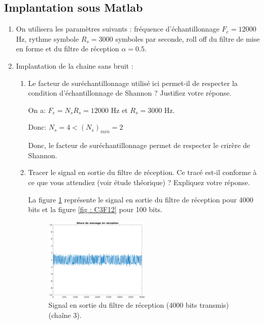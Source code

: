 \documentclass[frenchb]{article}
\begin{document}
\subsection{Implantation sous Matlab}

    \begin{enumerate}
        \item On utilisera les paramètres suivants : fréquence d'échantillonnage $F_e=12000$ Hz, rythme symbole $R_s=3000$ symboles par seconde, roll off du filtre de mise en forme et du filtre de réception $\alpha=0.5$.
        \item Implantation de la chaine sans bruit :
            \begin{enumerate}
                \item Le facteur de suréchantillonnage utilisé ici permet-il de respecter la condition d'échantillonnage de Shannon ? Justifiez votre réponse.
                
                \par\leavevmode\par
                \setlength\parindent{0.5cm}
                On a: $ F_e = N_s R_s = 12000$ Hz et $R_s = 3000$ Hz. 
                
                Donc: $N_s = 4 < (N_s)_{min}=2$
                
                Donc, le facteur de suréchantillonnage permet de respecter le crirère de Shannon.
                \par\leavevmode\par
                
                
                \item Tracer le signal en sortie du filtre de réception. Ce tracé est-il conforme à ce que vous attendiez (voir étude théorique) ? Expliquez votre réponse.
                \par\leavevmode\par
                \setlength\parindent{0.5cm}
                La figure \ref{fig : C3F1} représente  le signal en sortie du filtre de réception pour 4000 bits et la figure \ref{fig : C3F12} pour 100 bits.
        
                 \begin{figure}[ht!]
		         \centering
		         \includegraphics[width=5cm]{C3F1.png}		              			     \caption{Signal en sortie du filtre de réception (4000 bits transmis)(chaîne 3). \label{fig : C3F1}}
		         \end{figure}
		         

\end{enumerate}
\end{enumerate}
\end{document}
